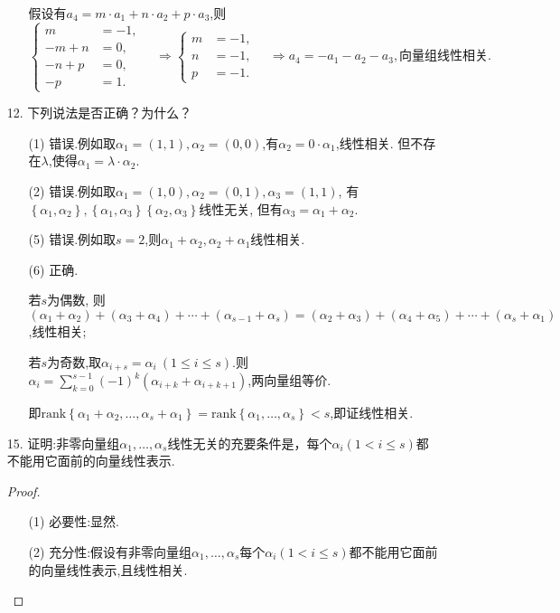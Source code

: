 \documentclass{article}
\begin{document}
\begin{enumerate}
\begin{enumerate}
        假设有$a_4=m\cdot a_1+n\cdot a_2+p\cdot a_3$,则
        \[
            \begin{cases}
                m &=-1,\\
                -m+n &=0,\\
                -n+p &=0,\\
                -p &=1.
            \end{cases}
            \quad \Rightarrow
            \begin{cases}
                m &=-1,\\
                n &=-1,\\
                p &=-1.
            \end{cases}
            \quad \Rightarrow
            a_4=-a_1-a_2-a_3,\mbox{向量组线性相关.}
        \]
    \end{enumerate}
    \item [12.]下列说法是否正确？为什么？
    \begin{enumerate}
        \item [(1)]错误.例如取$\alpha_1=(1,1),\alpha_2=(0,0)$,有$\alpha_2=0\cdot \alpha_1$,线性相关.
        但不存在$\lambda$,使得$\alpha_1=\lambda\cdot \alpha_2$.
        \item [(2)]错误.例如取$\alpha_1=(1,0),\alpha_2=(0,1),\alpha_3=(1,1)$,
        有$\left\{\alpha_1,\alpha_2\right\},\left\{\alpha_1,\alpha_3\right\}\left\{\alpha_2,\alpha_3\right\}$线性无关,
        但有$\alpha_3=\alpha_1+\alpha_2$.
        \item [(5)]错误.例如取$s=2$,则$\alpha_1+\alpha_2,\alpha_2+\alpha_1$线性相关.
        \item [(6)]正确.
        \item []若$s$为偶数,
        则$(\alpha_1+\alpha_2)+(\alpha_3+\alpha_4)+\cdots+(\alpha_{s-1}+\alpha_s)=(\alpha_2+\alpha_3)+(\alpha_4+\alpha_5)+\cdots+(\alpha_s+\alpha_1)$,线性相关;
        \item []若$s$为奇数,取$\alpha_{i+s}=\alpha_i\ (1\leqslant i\leqslant s)$.则
        $\alpha_i=\sum\limits_{k=0}^{s-1} {(-1)}^{k} (\alpha_{i+k}+\alpha_{i+k+1})$,两向量组等价.
        
        即$\mbox{rank}\left\{\alpha_1+\alpha_2,\ldots,\alpha_s+\alpha_1\right\}=\mbox{rank}\left\{\alpha_1,\ldots,\alpha_s \right\}<s$,即证线性相关.
    \end{enumerate}
    \item [15.]证明:非零向量组$\alpha_1,\ldots,\alpha_s$线性无关的充要条件是，每个$\alpha_i(1<i\leqslant s)$都不能用它面前的向量线性表示.
    \begin{proof}
        \begin{enumerate}
            \item []
            \item [(1)]必要性:显然.
            \item [(2)]充分性:假设有非零向量组$\alpha_1,\ldots,\alpha_s$每个$\alpha_i(1<i\leqslant s)$都不能用它面前的向量线性表示,且线性相关.
            

\end{enumerate}
\end{proof}
\end{enumerate}
\end{document}
